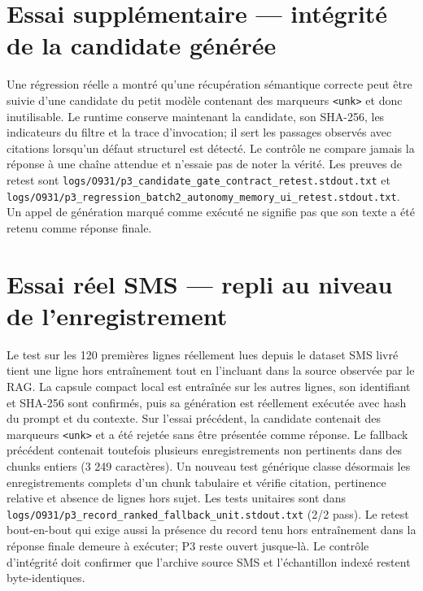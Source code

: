 \documentclass[11pt,a4paper]{article}
\begin{document}
\section{Essai supplémentaire — intégrité de la candidate générée}
Une régression réelle a montré qu’une récupération sémantique correcte peut être suivie d’une candidate du petit modèle contenant des marqueurs \texttt{<unk>} et donc inutilisable. Le runtime conserve maintenant la candidate, son SHA-256, les indicateurs du filtre et la trace d’invocation; il sert les passages observés avec citations lorsqu’un défaut structurel est détecté. Le contrôle ne compare jamais la réponse à une chaîne attendue et n’essaie pas de noter la vérité. Les preuves de retest sont \texttt{logs/O931/p3\_candidate\_gate\_contract\_retest.stdout.txt} et \texttt{logs/O931/p3\_regression\_batch2\_autonomy\_memory\_ui\_retest.stdout.txt}. Un appel de génération marqué comme exécuté ne signifie pas que son texte a été retenu comme réponse finale.

\section{Essai réel SMS — repli au niveau de l'enregistrement}
Le test sur les 120 premières lignes réellement lues depuis le dataset SMS livré tient une ligne hors entraînement tout en l'incluant dans la source observée par le RAG. La capsule compact local est entraînée sur les autres lignes, son identifiant et SHA-256 sont confirmés, puis sa génération est réellement exécutée avec hash du prompt et du contexte. Sur l'essai précédent, la candidate contenait des marqueurs \texttt{<unk>} et a été rejetée sans être présentée comme réponse. Le fallback précédent contenait toutefois plusieurs enregistrements non pertinents dans des chunks entiers (3 249 caractères). Un nouveau test générique classe désormais les enregistrements complets d'un chunk tabulaire et vérifie citation, pertinence relative et absence de lignes hors sujet. Les tests unitaires sont dans \texttt{logs/O931/p3\_record\_ranked\_fallback\_unit.stdout.txt} (2/2 pass). Le retest bout-en-bout qui exige aussi la présence du record tenu hors entraînement dans la réponse finale demeure à exécuter; P3 reste ouvert jusque-là. Le contrôle d'intégrité doit confirmer que l'archive source SMS et l'échantillon indexé restent byte-identiques.
\end{document}
